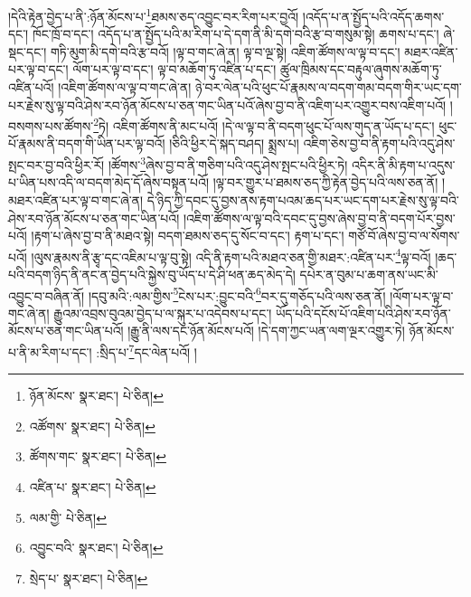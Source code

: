 །དེའི་རྟེན་བྱེད་པ་ནི་:ཉོན་མོངས་པ་\footnote{ཉོན་མོངས་  སྣར་ཐང་།  པེ་ཅིན། }ཐམས་ཅད་འབྱུང་བར་རིག་པར་བྱའོ། །འདོད་པ་ན་སྤྱོད་པའི་འདོད་ཆགས་དང་། ཁོང་ཁྲོ་བ་དང་། འདོད་པ་ན་སྤྱོད་པའི་མ་རིག་པ་དེ་དག་ནི་མི་དགེ་བའི་རྩ་བ་གསུམ་སྟེ། ཆགས་པ་དང་། ཞེ་སྡང་དང་། གཏི་མུག་མི་དགེ་བའི་རྩ་བའོ། །ལྟ་བ་གང་ཞེ་ན། ལྟ་བ་ལྔ་སྟེ། འཇིག་ཚོགས་ལ་ལྟ་བ་དང་། མཐར་འཛིན་པར་ལྟ་བ་དང་། ལོག་པར་ལྟ་བ་དང་། ལྟ་བ་མཆོག་ཏུ་འཛིན་པ་དང་། ཚུལ་ཁྲིམས་དང་བརྟུལ་ཞུགས་མཆོག་ཏུ་འཛིན་པའོ། །འཇིག་ཚོགས་ལ་ལྟ་བ་གང་ཞེ་ན། ཉེ་བར་ལེན་པའི་ཕུང་པོ་རྣམས་ལ་བདག་གམ་བདག་གིར་ཡང་དག་པར་རྗེས་སུ་ལྟ་བའི་ཤེས་རབ་ཉོན་མོངས་པ་ཅན་གང་ཡིན་པའོ་ཞེས་བྱ་བ་ནི་འཇིག་པར་འགྱུར་བས་འཇིག་པའོ། །བསགས་པས་ཚོགས་\footnote{འཚོགས་  སྣར་ཐང་།  པེ་ཅིན། }ཏེ། འཇིག་ཚོགས་ནི་མང་པའོ། །དེ་ལ་ལྟ་བ་ནི་བདག་ཕུང་པོ་ལས་གུད་ན་ཡོད་པ་དང་། ཕུང་པོ་རྣམས་ནི་བདག་གི་ཡིན་པར་ལྟ་བའོ། །ཅིའི་ཕྱིར་དེ་སྐད་བཤད། སྨྲས་པ། འཇིག་ཅེས་བྱ་བ་ནི་རྟག་པའི་འདུ་ཤེས་སྤང་བར་བྱ་བའི་ཕྱིར་རོ། །ཚོགས་\footnote{ཚོགས་གང་  སྣར་ཐང་།  པེ་ཅིན། }ཞེས་བྱ་བ་ནི་གཅིག་པའི་འདུ་ཤེས་སྤང་པའི་ཕྱིར་ཏེ། འདིར་ནི་མི་རྟག་པ་འདུས་པ་ཡིན་པས་འདི་ལ་བདག་མེད་དོ་ཞེས་བསྟན་པའོ། །ལྟ་བར་གྱུར་པ་ཐམས་ཅད་ཀྱི་རྟེན་བྱེད་པའི་ལས་ཅན་ནོ། །མཐར་འཛིན་པར་ལྟ་བ་གང་ཞེ་ན། དེ་ཉིད་ཀྱི་དབང་དུ་བྱས་ནས་རྟག་པའམ་ཆད་པར་ཡང་དག་པར་རྗེས་སུ་ལྟ་བའི་ཤེས་རབ་ཉོན་མོངས་པ་ཅན་གང་ཡིན་པའོ། །འཇིག་ཚོགས་ལ་ལྟ་བའི་དབང་དུ་བྱས་ཞེས་བྱ་བ་ནི་བདག་པོར་བྱས་པའོ། །རྟག་པ་ཞེས་བྱ་བ་ནི་མཐའ་སྟེ། བདག་ཐམས་ཅད་དུ་སོང་བ་དང་། རྟག་པ་དང་། གཙོ་བོ་ཞེས་བྱ་བ་ལ་སོགས་པའོ། །ལུས་རྣམས་ནི་རྩྭ་དང་འཇིམ་པ་ལྟ་བུ་སྟེ། འདི་ནི་རྟག་པའི་མཐའ་ཅན་གྱི་མཐར་:འཛིན་པར་\footnote{འཛིན་པ་  སྣར་ཐང་།  པེ་ཅིན། }ལྟ་བའོ། །ཆད་པའི་བདག་ཉིད་ནི་ནང་ན་བྱེད་པའི་སྐྱེས་བུ་ཡོད་པ་དེ་ཤི་ཕན་ཆད་མེད་དེ། དཔེར་ན་བུམ་པ་ཆག་ནས་ཡང་མི་འབྱུང་བ་བཞིན་ནོ། །དབུ་མའི་:ལམ་གྱིས་\footnote{ལམ་གྱི་  པེ་ཅིན། }ངེས་པར་:བྱུང་བའི་\footnote{འབྱུང་བའི་  སྣར་ཐང་།  པེ་ཅིན། }བར་དུ་གཅོད་པའི་ལས་ཅན་ནོ། །ལོག་པར་ལྟ་བ་གང་ཞེ་ན། རྒྱུའམ་འབྲས་བུའམ་བྱེད་པ་ལ་སྐུར་པ་འདེབས་པ་དང་། ཡོད་པའི་དངོས་པོ་འཇིག་པའི་ཤེས་རབ་ཉོན་མོངས་པ་ཅན་གང་ཡིན་པའོ། །རྒྱུ་ནི་ལས་དང་ཉོན་མོངས་པའོ། །དེ་དག་ཀྱང་ཡན་ལག་ལྔར་འགྱུར་ཏེ། ཉོན་མོངས་པ་ནི་མ་རིག་པ་དང་། :སྲིད་པ་\footnote{སྲེད་པ་  སྣར་ཐང་།  པེ་ཅིན། }དང་ལེན་པའོ། །
